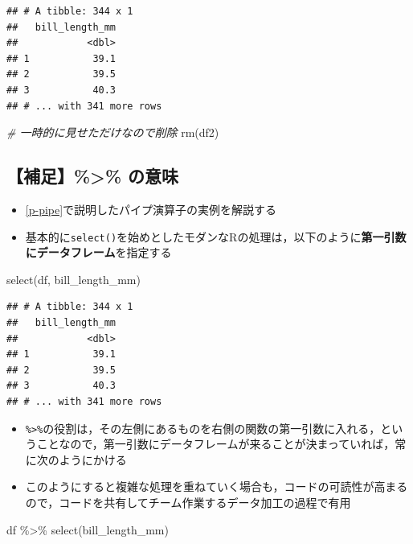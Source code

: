 \documentclass[
  xelatex,ja=standard, b5paper]{bxjsbook}
\newenvironment{Shaded}{\begin{snugshade}}{\end{snugshade}}
\newcommand{\CommentTok}[1]{\textcolor[rgb]{0.56,0.35,0.01}{\textit{#1}}}
\newcommand{\FunctionTok}[1]{\textcolor[rgb]{0.00,0.00,0.00}{#1}}
\newcommand{\NormalTok}[1]{#1}
\newcommand{\SpecialCharTok}[1]{\textcolor[rgb]{0.00,0.00,0.00}{#1}}
\providecommand{\tightlist}{%
  \setlength{\itemsep}{0pt}\setlength{\parskip}{0pt}}
\begin{document}
\begin{verbatim}
## # A tibble: 344 x 1
##   bill_length_mm
##            <dbl>
## 1           39.1
## 2           39.5
## 3           40.3
## # ... with 341 more rows
\end{verbatim}

\begin{Shaded}
\begin{Highlighting}[]
\CommentTok{\# 一時的に見せただけなので削除}
\FunctionTok{rm}\NormalTok{(df2)}
\end{Highlighting}
\end{Shaded}

\hypertarget{select-standard-pipe}{%
\subsection{【補足】\%\textgreater\% の意味}\label{select-standard-pipe}}

\begin{itemize}
\tightlist
\item
  \ref{p-pipe}で説明したパイプ演算子の実例を解説する
\item
  基本的に\texttt{select()}を始めとしたモダンなRの処理は，以下のように\textbf{第一引数にデータフレーム}を指定する
\end{itemize}

\begin{Shaded}
\begin{Highlighting}[]
\FunctionTok{select}\NormalTok{(df, bill\_length\_mm)}
\end{Highlighting}
\end{Shaded}

\begin{verbatim}
## # A tibble: 344 x 1
##   bill_length_mm
##            <dbl>
## 1           39.1
## 2           39.5
## 3           40.3
## # ... with 341 more rows
\end{verbatim}

\begin{itemize}
\tightlist
\item
  \texttt{\%\textgreater{}\%}の役割は，その左側にあるものを右側の関数の第一引数に入れる，ということなので，第一引数にデータフレームが来ることが決まっていれば，常に次のようにかける
\item
  このようにすると複雑な処理を重ねていく場合も，コードの可読性が高まるので，コードを共有してチーム作業するデータ加工の過程で有用
\end{itemize}

\begin{Shaded}
\begin{Highlighting}[]
\NormalTok{df }\SpecialCharTok{\%\textgreater{}\%} 
  \FunctionTok{select}\NormalTok{(bill\_length\_mm)}
\end{Highlighting}
\end{Shaded}
\end{document}
